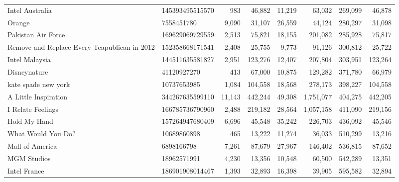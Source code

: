 \begin{longtable}{llrrrrrr}
                                   Intel Australia &  145393495515570 &     983 &      46,882 &     11,219 &      63,032 &     269,099 &    46,878 \\
                                            Orange &       7558451780 &   9,090 &      31,107 &     26,559 &      44,124 &     280,297 &    31,098 \\
                                Pakistan Air Force &  169629069729559 &   2,513 &      75,821 &     18,155 &     201,082 &     285,928 &    75,817 \\
      Remove and Replace Every Teapublican in 2012 &  152358668171541 &   2,408 &      25,755 &      9,773 &      91,126 &     300,812 &    25,722 \\
                                    Intel Malaysia &  144511635581827 &   2,951 &     123,276 &     12,407 &     207,804 &     303,951 &   123,264 \\
                                      Disneynature &      41120927270 &     413 &      67,000 &     10,875 &     129,282 &     371,780 &    66,979 \\
                               kate spade new york &      10737653985 &   1,084 &     104,558 &     18,568 &     278,173 &     398,227 &   104,558 \\
                              A Little Inspiration &  344267635599110 &  11,143 &     442,244 &     49,308 &   1,751,077 &     404,275 &   442,205 \\
                                 I Relate Feelings &  166785736790960 &   2,488 &     219,182 &     28,564 &   1,057,158 &     411,090 &   219,156 \\
                                      Hold My Hand &  157264947680409 &   6,696 &      45,548 &     35,242 &     226,703 &     436,092 &    45,546 \\
                                What Would You Do? &      10689860898 &     465 &      13,222 &     11,274 &      36,033 &     510,299 &    13,216 \\
                                   Mall of America &       6898166798 &   7,261 &      87,679 &     27,967 &     146,402 &     536,815 &    87,652 \\
                                       MGM Studios &      18962571991 &   4,230 &      13,356 &     10,548 &      60,500 &     542,289 &    13,351 \\
                                      Intel France &  186901908014467 &   1,393 &      32,893 &     16,398 &      39,905 &     595,582 &    32,894 \\

\end{longtable}

